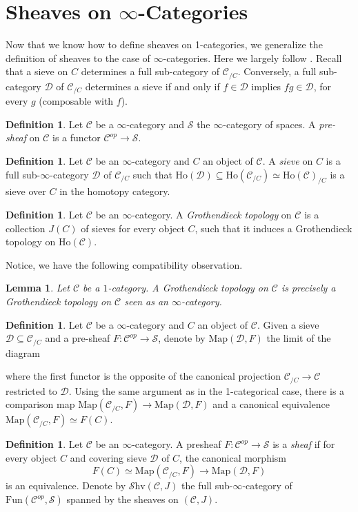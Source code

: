 \documentclass[10pt]{amsart}
\newcommand{\C}{\mathscr{C}}
\newcommand{\D}{\mathscr{D}}
\newcommand{\s}{\mathscr{S}}
\newcommand{\Map}{\mathrm{Map}}
\newcommand{\Ho}{\mathrm{Ho}}
\newcommand{\Fun}{\mathrm{Fun}}
\newcommand{\Shv}{\mathscr{S}\mathrm{hv}}
\newtheorem{lemma}[equation]{Lemma}
\theoremstyle{definition}
\newtheorem{definition}[equation]{Definition}
\theoremstyle{remark}
\numberwithin{equation}{section}
\begin{document}
	\section{Sheaves on \texorpdfstring{$\infty$}{oo}-Categories}
	Now that we know how  to define sheaves on 1-categories, we generalize the definition of sheaves to the case of $\infty$-categories. Here we largely follow \cite{lurie2009htt}. Recall that a sieve on $C$ determines a full sub-category of $\C_{/C}$. Conversely, a full sub-category $\D$ of $\C_{/C}$ determines a sieve if and only if $f\in\D$ implies $fg\in\D$, for every $g$ (composable with $f$). 
	\begin{definition}
		Let $\C$ be a $\infty$-category and $\s$ the $\infty$-category of spaces. A \textit{pre-sheaf} on $\C$ is a functor $\C^{op}\to\s$.
	\end{definition}
	\begin{definition}
		Let $\C$ be an $\infty$-category and $C$ an object of $\C$. A \textit{sieve} on $C$ is a full sub-$\infty$-category $\D$ of $\C_{/C}$ such that $\Ho(\D)\subseteq\Ho(\C_{/C})\simeq\Ho(\C)_{/C}$ is a sieve over $C$ in the homotopy category. 
	\end{definition}
	\begin{definition}
		Let $\C$ be an $\infty$-category. A \emph{Grothendieck topology} on $\C$ is a collection $J(C)$ of sieves for every object $C$, such that it induces a Grothendieck topology on $\Ho(\C)$. 
	\end{definition}
	
	Notice, we have the following compatibility observation.
	\begin{lemma}
		Let $\C$ be a $1$-category. A Grothendieck topology on $\C$ is precisely a Grothendieck topology on $\C$ seen as an $\infty$-category.
	\end{lemma}
	\begin{definition}
		Let $\C$ be a $\infty$-category and $C$ an object of $\C$. Given a sieve $\D\subseteq\C_{/C}$ and a pre-sheaf $F:\C^{op}\to\s$, denote by $\Map(\D,F)$ the limit of the diagram \begin{center}
	\end{center}where the first functor is the opposite of the canonical projection $\C_{/C}\to\C$ restricted to $\D$. Using the same argument as in the 1-categorical case, there is a comparison map $\Map(\C_{/C},F)\to\Map(\D,F)$ and a canonical equivalence $\Map(\C_{/C},F)\simeq F(C)$. 
	\end{definition}
	\begin{definition}
		Let $\C$ be an $\infty$-category. A presheaf $F\colon\C^{op}\to\s$ is a \emph{sheaf} if for every object $C$ and covering sieve $\D$ of $C$, the canonical morphism
		\[ F(C)\simeq\Map(\C_{/C},F) \to \Map(\D,F) \]
		is an equivalence. Denote by $\Shv(\C,J)$ the full sub-$\infty$-category of $\Fun(\C^{op},\s)$ spanned by the sheaves on $(\C,J)$.
	\end{definition}
	
\end{document}
